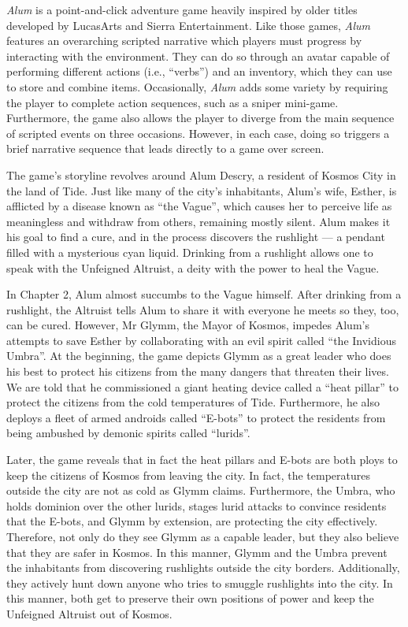 \textit{Alum} \parencite{orsie_alum_2006} is a point-and-click adventure game heavily inspired by older titles developed by LucasArts and Sierra Entertainment. Like those games, \textit{Alum} features an overarching scripted narrative which players must progress by interacting with the environment. They can do so through an avatar capable of performing different actions (i.e., ``verbs'') and an inventory, which they can use to store and combine items. Occasionally, \textit{Alum} adds some variety by requiring the player to complete action sequences, such as a sniper mini-game. Furthermore, the game also allows the player to diverge from the main sequence of scripted events on three occasions. However, in each case, doing so triggers a brief narrative sequence that leads directly to a game over screen.

The game's storyline revolves around Alum Descry, a resident of Kosmos City in the land of Tide. Just like many of the city's inhabitants, Alum's wife, Esther, is afflicted by a disease known as ``the Vague'', which causes her to perceive life as meaningless and withdraw from others, remaining mostly silent. Alum makes it his goal to find a cure, and in the process discovers the rushlight --- a pendant filled with a mysterious cyan liquid. Drinking from a rushlight allows one to speak with the Unfeigned Altruist, a deity with the power to heal the Vague. 

In Chapter 2, Alum almost succumbs to the Vague himself. After drinking from a rushlight, the Altruist tells Alum to share it with everyone he meets so they, too, can be cured. However, Mr Glymm, the Mayor of Kosmos, impedes Alum's attempts to save Esther by collaborating with an evil spirit called ``the Invidious Umbra''. At the beginning, the game depicts Glymm as a great leader who does his best to protect his citizens from the many dangers that threaten their lives. We are told that he commissioned a giant heating device called a ``heat pillar'' to protect the citizens from the cold temperatures of Tide. Furthermore, he also deploys a fleet of armed androids called ``E-bots'' to protect the residents from being ambushed by demonic spirits called ``lurids''.

Later, the game reveals that in fact the heat pillars and E-bots are both ploys to keep the citizens of Kosmos from leaving the city. In fact, the temperatures outside the city are not as cold as Glymm claims. Furthermore, the Umbra, who holds dominion over the other lurids, stages lurid attacks to convince residents that the E-bots, and Glymm by extension, are protecting the city effectively. Therefore, not only do they see Glymm as a capable leader, but they also believe that they are safer in Kosmos. In this manner, Glymm and the Umbra prevent the inhabitants from discovering rushlights outside the city borders. Additionally, they actively hunt down anyone who tries to smuggle rushlights into the city. In this manner, both get to preserve their own positions of power and keep the Unfeigned Altruist out of Kosmos.

